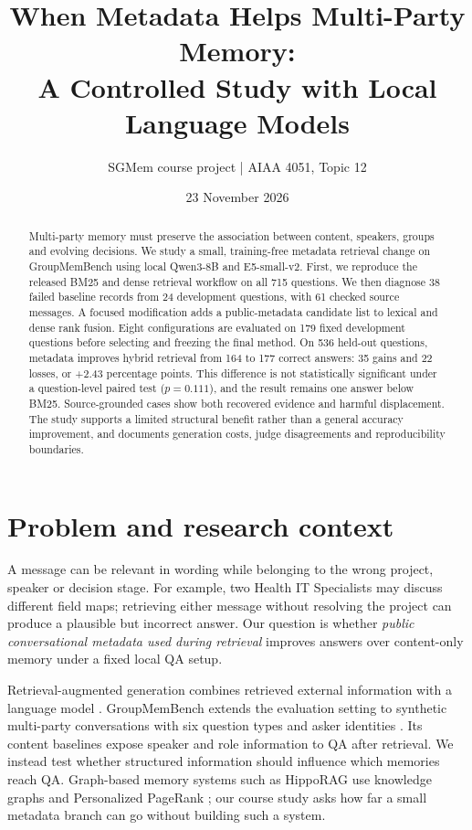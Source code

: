 \documentclass[10pt,a4paper]{article}
\title{\vspace{-1.3em}\textbf{When Metadata Helps Multi-Party Memory:}\\A Controlled Study with Local Language Models\vspace{-0.4em}}
\author{SGMem course project | AIAA 4051, Topic 12}
\date{23 November 2026\vspace{-0.8em}}
\begin{document}
\fontsize{10.5}{12.7}\selectfont
\maketitle
\thispagestyle{fancy}
\begin{abstract}
Multi-party memory must preserve the association between content, speakers, groups and evolving decisions. We study a small, training-free metadata retrieval change on GroupMemBench using local Qwen3-8B and E5-small-v2. First, we reproduce the released BM25 and dense retrieval workflow on all 715 questions. We then diagnose 38 failed baseline records from 24 development questions, with 61 checked source messages. A focused modification adds a public-metadata candidate list to lexical and dense rank fusion. Eight configurations are evaluated on 179 fixed development questions before selecting and freezing the final method. On 536 held-out questions, metadata improves hybrid retrieval from 164 to 177 correct answers: 35 gains and 22 losses, or +2.43 percentage points. This difference is not statistically significant under a question-level paired test ($p=0.111$), and the result remains one answer below BM25. Source-grounded cases show both recovered evidence and harmful displacement. The study supports a limited structural benefit rather than a general accuracy improvement, and documents generation costs, judge disagreements and reproducibility boundaries.
\end{abstract}

\section{Problem and research context}
A message can be relevant in wording while belonging to the wrong project, speaker or decision stage. For example, two Health IT Specialists may discuss different field maps; retrieving either message without resolving the project can produce a plausible but incorrect answer. Our question is whether \emph{public conversational metadata used during retrieval} improves answers over content-only memory under a fixed local QA setup.

Retrieval-augmented generation combines retrieved external information with a language model \cite{rag}. GroupMemBench extends the evaluation setting to synthetic multi-party conversations with six question types and asker identities \cite{groupmembench}. Its content baselines expose speaker and role information to QA after retrieval. We instead test whether structured information should influence which memories reach QA. Graph-based memory systems such as HippoRAG use knowledge graphs and Personalized PageRank \cite{hipporag}; our course study asks how far a small metadata branch can go without building such a system.
\end{document}
